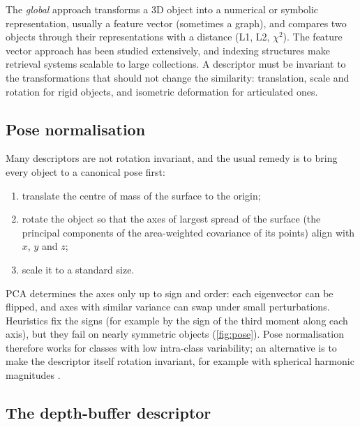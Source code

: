 The \emph{global} approach transforms a 3D object into a numerical or symbolic representation,
usually a feature vector (sometimes a graph), and compares two objects through their
representations with a distance (L1, L2, $\chi^2$). The feature vector approach has been studied
extensively, and indexing structures make retrieval systems scalable to large collections. A
descriptor must be invariant to the transformations that should not change the similarity:
translation, scale and rotation for rigid objects, and isometric deformation for articulated ones.

\subsection{Pose normalisation}

Many descriptors are not rotation invariant, and the usual remedy is to bring every object to a
canonical pose first:
\begin{enumerate}
  \item translate the centre of mass of the surface to the origin;
  \item rotate the object so that the axes of largest spread of the surface (the principal
  components of the area-weighted covariance of its points) align with $x$, $y$ and $z$;
  \item scale it to a standard size.
\end{enumerate}
PCA determines the axes only up to sign and order: each eigenvector can be flipped, and axes with
similar variance can swap under small perturbations. Heuristics fix the signs (for example by the
sign of the third moment along each axis), but they fail on nearly symmetric objects
(\cref{fig:pose}). Pose normalisation therefore works for classes with low intra-class variability;
an alternative is to make the descriptor itself rotation invariant, for example with spherical
harmonic magnitudes \citep{Kazhdan2003}.


\subsection{The depth-buffer descriptor}

